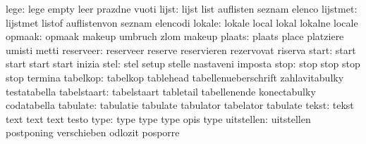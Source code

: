                      lege: lege                      empty
                           leer                      prazdne
                           vuoti
                    lijst: lijst                     list
                           auflisten                 seznam
                           elenco
                 lijstmet: lijstmet                  listof
                           auflistenvon              seznam
                           elencodi
                   lokale: lokale                    local
                           lokal                     lokalne
                           locale
                   opmaak: opmaak                    makeup
                           umbruch                   zlom
                           makeup                    %
                   plaats: plaats                    place
                           platziere                 umisti
                           metti
                reserveer: reserveer                 reserve
                           reservieren               rezervovat
                           riserva
                    start: start                     start
                           start                     start
                           inizia
                     stel: stel                      setup
                           stelle                    nastaveni
                           imposta
                     stop: stop                      stop
                           stop                      stop
                           termina
                 tabelkop: tabelkop                  tablehead
                           tabellenueberschrift      zahlavitabulky
                           testatabella              %
              tabelstaart: tabelstaart               tabletail
                           tabellenende              konectabulky
                           codatabella               %
                 tabulate: tabulatie                 tabulate
                           tabulator                 tabelator
                           tabulate                  %
                    tekst: tekst                     text
                           text                      text
                           testo
                     type: type                      type
                           type                      opis
                           type                      %
               uitstellen: uitstellen                postponing
                           verschieben               odlozit
                           posporre                  %
